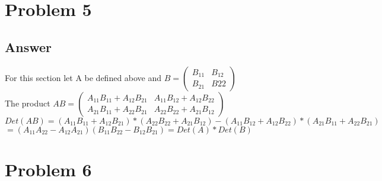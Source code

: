 \documentclass{article}
\begin{document}
\section*{Problem 5}
\subsection*{Answer}
For this section let A be defined above and \(B = \begin{pmatrix} B_{11} & B_{12} \\ B_{21} & B{22} \end{pmatrix} \)
\\ The product \(AB = \begin{pmatrix}
A_{11}B_{11} + A_{12}B_{21} & A_{11}B_{12} + A_{12}B_{22} \\
A_{21}B_{11} + A_{22}B_{21} & A_{22}B_{22} + A_{21}B_{12} \end{pmatrix}\)
\\ \(Det(AB) = (A_{11}B_{11} + A_{12}B_{21})*(A_{22}B_{22} + A_{21}B_{12}) - (A_{11}B_{12} + A_{12}B_{22})*(A_{21}B_{11} + A_{22}B_{21})\)
\\ \( = (A_{11}A_{22} - A_{12}A_{21})(B_{11}B_{22} - B_{12}B_{21}) = Det(A) * Det(B)\)
\section*{Problem 6}
\end{document}
